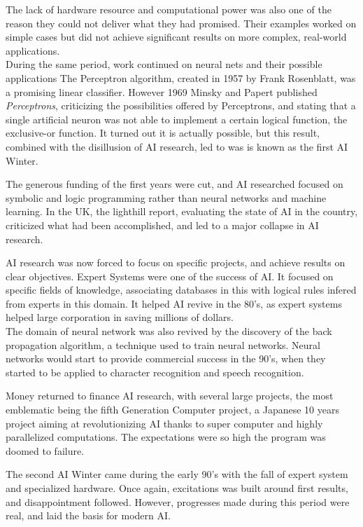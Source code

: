 \documentclass[12pt]{article}
\begin{document}
The lack of hardware resource and computational power was also one of the reason
they could not deliver what they had promised. Their examples worked on simple
cases but did not achieve significant results on more complex, real-world
applications.\\

During the same period, work continued on neural nets and their possible
applications The Perceptron algorithm, created in 1957 by Frank Rosenblatt, was
a promising linear classifier. However 1969 Minsky and Papert published {\em
Perceptrons}, criticizing the possibilities offered by Perceptrons, and stating
that a single artificial neuron was not able to implement a certain logical
function, the exclusive-or function. It turned out it is actually possible, but
this result, combined with the disillusion of AI research, led to was is known as
the first AI Winter.

The generous funding of the first years were cut, and AI researched focused on
symbolic and logic programming rather than neural networks and machine learning.
In the UK, the lighthill report, evaluating the state of AI in the country,
criticized what had been accomplished, and led to a major collapse in AI
research.

AI research was now forced to focus on specific projects, and achieve results on
clear objectives. Expert Systems were one of the success of AI. It focused on
specific fields of knowledge, associating databases in this with logical rules
infered from experts in this domain. It helped AI revive in the 80's, as expert
systems  helped large corporation in saving millions of dollars.\\

The domain of neural network was also revived by the discovery of the back
propagation algorithm, a technique used to train neural networks. Neural
networks would start to provide commercial success in the 90's, when they
started to be  applied to character recognition and speech recognition.

Money returned to finance AI research, with several large projects, the most
emblematic being the fifth Generation Computer project, a Japanese 10 years
project aiming at revolutionizing AI thanks to super computer and highly
parallelized computations. The expectations were so high the program was doomed
to failure.

The second AI Winter came during the early 90's with the fall of expert system
and  specialized hardware. Once again, excitations was built around first
results, and  disappointment followed. However, progresses made during this
period were real,  and laid the basis for modern AI.\\
\end{document}
